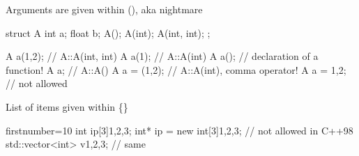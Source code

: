 \begin{frame}[fragile]
  \begin{block}{Arguments are given within (), aka  nightmare}
    \begin{cppcode*}{}
      struct A {
        int a;
        float b;
        A();
        A(int);
        A(int, int);
      };

      A a(1,2);    // A::A(int, int)
      A a(1);      // A::A(int)
      A a();       // declaration of a function!
      A a;         // A::A()
      A a = (1,2); // A::A(int), comma operator!
      A a = {1,2}; // not allowed
    \end{cppcode*}
  \end{block}
\end{frame}

\begin{frame}[fragile]
  \begin{exampleblock}{List of items given within \{\}}
    \begin{cppcode*}{firstnumber=10}
     int ip[3]{1,2,3};
     int* ip = new int[3]{1,2,3}; // not allowed in C++98
     std::vector<int> v{1,2,3};   // same
    \end{cppcode*}
  \end{exampleblock}
\end{frame}
